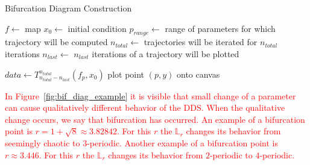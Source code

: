 \begin{algorithm}
\caption{Bifurcation Diagram Construction}\label{bif_diag_alg}
\begin{algorithmic}[1]
\Statex $f \gets$ map
\Statex $x_0 \gets$ initial condition
\Statex $p_{range} \gets$ range of parameters for which trajectory will be computed
\Statex $n_{total} \gets$ trajectories will be iterated for $n_{total}$ iterations
\Statex $n_{last} \gets$ $n_{last}$ iterations of a trajectory will be plotted

    \State $data \leftarrow T_{n_{total}-n_{last}}^{n_{total}}(f_p, x_0)$
        \State plot point $(p, y)$ onto canvas
    \EndFor
\EndFor

\end{algorithmic}
\end{algorithm}

\begin{remark}
    \textcolor{red}{
    In Figure~\ref{fig:bif_diag_example} it is visible that small change of a parameter can cause qualitatively different behavior of the DDS.
    When the qualitative change occurs, we say that bifurcation has occurred.
    An example of a bifurcation point is $r = 1+\sqrt{8} \approx 3.82842$. For this $r$ the $\mathbb{L}_{r}$ changes its behavior from seemingly chaotic to $3$-periodic. 
    Another example of a bifurcation point is $r \approx 3.446$. For this $r$ the $\mathbb{L}_{r}$ changes its behavior from $2$-periodic to $4$-periodic.
    }
\end{remark}